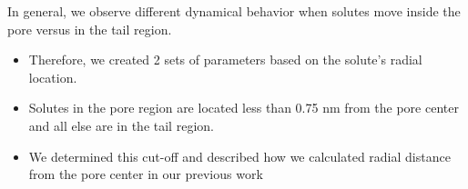 \documentclass{article}
\begin{document}
  In general, we observe different dynamical behavior when solutes move inside the
  pore versus in the tail region.
  \begin{itemize}
    \item Therefore, we created 2 sets of parameters based on the solute's radial location.
    \item Solutes in the pore region are located less than 0.75 nm from the pore center and
    all else are in the tail region. 
    \item We determined this cut-off and described how we calculated radial 
    distance from the pore center in our previous work~\cite{coscia_chemically_2019}
  \end{itemize}

\end{document}
